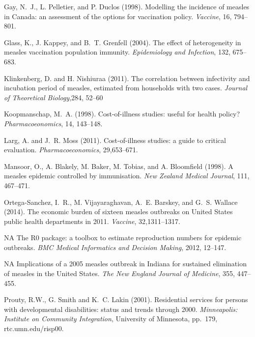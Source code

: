 \documentclass{article}
\begin{document}
{\begin{thebibliography}{}
Gay, N.~J., L. Pelletier, and P. Duclos (1998).
\newblock Modelling the incidence of measles in Canada: an assessment of the options for vaccination policy.
\newblock \emph{Vaccine}, 16, 794--801.

Glass, K., J. Kappey, and B.~T. Grenfell (2004).
\newblock The effect of heterogeneity in measles vaccination population immunity.
\newblock \emph{Epidemiology and Infection}, 132, 675--683.

Klinkenberg, D. and H. Nishiuraa (2011).
\newblock The correlation between infectivity and incubation period of measles, estimated from households with two cases.
\newblock \emph{Journal of Theoretical Biology},284, 52--60

Koopmanschap, M.~A. (1998).
\newblock Cost-of-illness studies: useful for health policy?
\newblock \emph{Pharmacoeonomics}, 14, 143--148.

Larg, A. and J.~R. Moss (2011).
\newblock Cost-of-illness studies: a guide to critical evaluation.
\newblock \emph{Pharmacoeconomics}, 29,653--671.

Mansoor, O., A. Blakely, M. Baker, M. Tobias, and A. Bloomfield (1998).
\newblock A measles epidemic controlled by immunisation. 
\newblock \emph{New Zealand Medical Journal}, 111, 467--471.

Ortega-Sanchez, I.~R., M. Vijayaraghavan, A.~E. Barskey, and G.~S. Wallace (2014).
\newblock The economic burden of sixteen measles outbreaks on United States public health departments in 2011.
\newblock \emph{Vaccine}, 32,1311--1317.

NA
\newblock The R0 package: a toolbox to estimate reproduction numbers for epidemic outbreaks.
\newblock \emph{BMC Medical Informatics and Decision Making}, 2012, 12--147.

NA
\newblock Implications of a 2005 measles outbreak in Indiana for sustained elimination of measles in the United States.
\newblock \emph{The New England Journal of Medicine}, 355, 447--455.

Prouty, R.W., G. Smith and K.~C. Lakin (2001).
\newblock Residential services for persons with developmental disabilities: status and trends through 2000.
\newblock \emph{Minneapolis: Institute on Community Integration}, University of Minnesota, pp.~179, rtc.umn.edu/risp00.


\end{thebibliography}}
\end{document}

